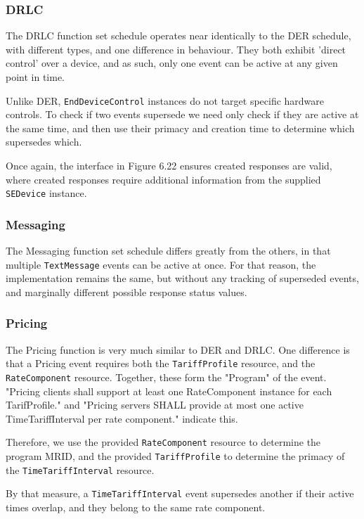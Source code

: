 \subsubsection{DRLC}
The DRLC function set schedule operates near identically to the DER schedule, with different types, and one difference in behaviour. They both exhibit 'direct control' over a device, and as such, only one event can be active at any given point in time.

Unlike DER, \texttt{EndDeviceControl} instances do not target specific hardware controls. To check if two events supersede we need only check if they are active at the same time, and then use their primacy and creation time to determine which supersedes which.

Once again, the interface in Figure 6.22 ensures created responses are valid, where created responses require additional information from the supplied \texttt{SEDevice} instance. 

\subsubsection{Messaging}
The Messaging function set schedule differs greatly from the others, in that multiple \texttt{TextMessage} events can be active at once. For that reason, the implementation remains the same, but without any tracking of superseded events, and marginally different possible response status values. 

\subsubsection{Pricing}
The Pricing function is very much similar to DER and DRLC. One difference is that a Pricing event requires both the \texttt{TariffProfile} resource, and the \texttt{RateComponent} resource. Together, these form the "Program" of the event. "Pricing clients shall support at least one RateComponent instance for each TarifProfile." and "Pricing servers SHALL provide at most one active TimeTariffInterval per rate component." indicate this.

Therefore, we use the provided \texttt{RateComponent} resource to determine the program MRID, and the provided \texttt{TariffProfile} to determine the primacy of the \texttt{TimeTariffInterval} resource. 

By that measure, a \texttt{TimeTariffInterval} event supersedes another if their active times overlap, and they belong to the same rate component.

